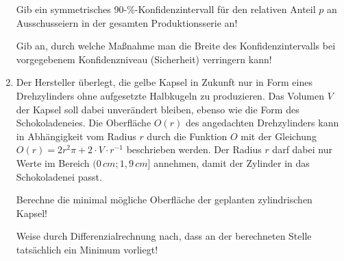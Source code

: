 \begin{langesbeispiel}
\begin{enumerate}
 Gib ein symmetrisches 90-\%-Konfidenzintervall für den relativen Anteil $p$ an Ausschusseiern in der gesamten Produktionsserie an!\leer

 Gib an, durch welche Maßnahme man die Breite des Konfidenzintervalls bei vorgegebenem Konfidenzniveau (Sicherheit) verringern kann!\leer

\item Der Hersteller überlegt, die gelbe Kapsel in Zukunft nur in Form eines Drehzylinders ohne aufgesetzte Halbkugeln zu produzieren. Das Volumen $V$ der Kapsel soll dabei unverändert bleiben, ebenso wie die Form des Schokoladeneies. Die Oberfläche $O(r)$ des angedachten Drehzylinders kann in Abhängigkeit vom Radius $r$ durch die Funktion $O$ mit der Gleichung $O(r)=2r^2\pi+2\cdot V\cdot r^{-1}$ beschrieben werden. Der Radius $r$ darf dabei nur Werte im Bereich $(0\,cm; 1,9\,cm]$ annehmen, damit der Zylinder in das Schokoladenei passt.\leer

 Berechne die minimal mögliche Oberfläche der geplanten zylindrischen Kapsel!\leer

 Weise durch Differenzialrechnung nach, dass an der berechneten Stelle tatsächlich ein Minimum vorliegt!
						\end{enumerate}\leer
				
\end{langesbeispiel}
